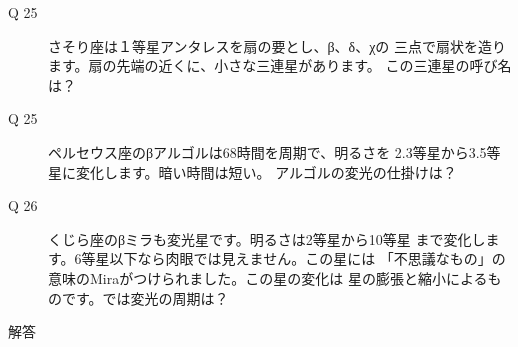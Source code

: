\documentclass[fleqn]{article}
\begin{document}
\begin{description}
\item[Q 25]{さそり座は１等星アンタレスを扇の要とし、β、δ、χの
三点で扇状を造ります。扇の先端の近くに、小さな三連星があります。
この三連星の呼び名は？

}

\item [Q 25]{ペルセウス座のβアルゴルは68時間を周期で、明るさを
2.3等星から3.5等星に変化します。暗い時間は短い。
アルゴルの変光の仕掛けは？

}
\item[Q 26]{くじら座のβミラも変光星です。明るさは2等星から10等星
まで変化します。6等星以下なら肉眼では見えません。この星には
「不思議なもの」の意味のMiraがつけられました。この星の変化は
星の膨張と縮小によるものです。では変光の周期は？


}
\end{description}
\newpage


\setlength{}






\newpage
{\Large 解答}
\end{document}
